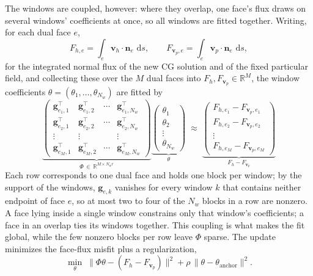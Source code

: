 \documentclass[a4paper,fleqn]{cas-sc}
\newcommand{\dd}{\,\mathrm{d}}
\newcommand{\vflux}{\mathbf{v}}
\newcommand{\vp}{\vflux_{p}}              %
\begin{document}
The windows are coupled, however: where they overlap, one face's flux draws on
several windows' coefficients at once, so all windows are fitted together.
Writing, for each dual face \(e\),
\[
  F_{h,e}=\int_e \vflux_h\cdot\mathbf{n}_e\,\dd s,
  \qquad
  F_{\vp,e}=\int_e \vp\cdot\mathbf{n}_e\,\dd s,
\]
for the integrated normal flux of the new CG solution and of the fixed
particular field, and collecting these over the \(M\) dual faces into
\(F_{h},F_{\vp}\in\mathbb{R}^{M}\), the window coefficients
\(\theta=(\theta_1,\ldots,\theta_{N_w})\) are fitted by
\begin{equation*}
\underbrace{\begin{pmatrix}
\mathbf{g}_{e_1,1}^{\top} & \mathbf{g}_{e_1,2}^{\top} & \cdots & \mathbf{g}_{e_1,N_w}^{\top}\\[2pt]
\mathbf{g}_{e_2,1}^{\top} & \mathbf{g}_{e_2,2}^{\top} & \cdots & \mathbf{g}_{e_2,N_w}^{\top}\\
\vdots & \vdots & & \vdots\\
\mathbf{g}_{e_M,1}^{\top} & \mathbf{g}_{e_M,2}^{\top} & \cdots & \mathbf{g}_{e_M,N_w}^{\top}
\end{pmatrix}}_{\Phi\,\in\,\mathbb{R}^{M\times N_w r}}
\underbrace{\begin{pmatrix}\theta_1\\ \theta_2\\ \vdots\\ \theta_{N_w}\end{pmatrix}}_{\theta}
\;\approx\;
\underbrace{\begin{pmatrix}
F_{h,e_1}-F_{\vp,e_1}\\
F_{h,e_2}-F_{\vp,e_2}\\
\vdots\\
F_{h,e_M}-F_{\vp,e_M}
\end{pmatrix}}_{F_{h}-F_{\vp}}
\end{equation*}
Each row corresponds to one dual face and holds one block per window; by the
support of the windows, \(\mathbf{g}_{e,k}\) vanishes for every window \(k\) that
contains neither endpoint of face \(e\), so at most two to four of the \(N_w\)
blocks in a row are nonzero. A face lying inside a single window constrains only
that window's coefficients; a face in an overlap ties its windows together. This
coupling is what makes the fit global, while the few nonzero blocks per row
leave \(\Phi\) sparse. The update minimizes the face-flux misfit plus a
regularization,
\[
  \min_{\theta}\;
  \bigl\|\Phi\theta-(F_{h}-F_{\vp})\bigr\|^2
  +\rho\,\bigl\|\theta-\theta_{\mathrm{anchor}}\bigr\|^2 .
\]
\end{document}
